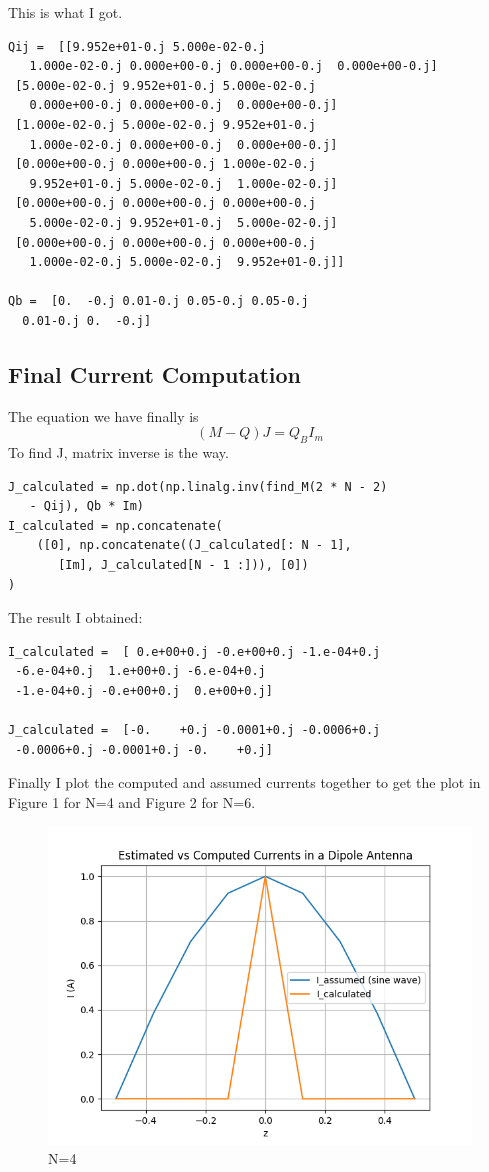 \documentclass[11pt, a4paper]{article}
\begin{document}
This is what I got.

\begin{verbatim}
Qij =  [[9.952e+01-0.j 5.000e-02-0.j 
   1.000e-02-0.j 0.000e+00-0.j 0.000e+00-0.j  0.000e+00-0.j]
 [5.000e-02-0.j 9.952e+01-0.j 5.000e-02-0.j 
   0.000e+00-0.j 0.000e+00-0.j  0.000e+00-0.j]
 [1.000e-02-0.j 5.000e-02-0.j 9.952e+01-0.j 
   1.000e-02-0.j 0.000e+00-0.j  0.000e+00-0.j]
 [0.000e+00-0.j 0.000e+00-0.j 1.000e-02-0.j 
   9.952e+01-0.j 5.000e-02-0.j  1.000e-02-0.j]
 [0.000e+00-0.j 0.000e+00-0.j 0.000e+00-0.j 
   5.000e-02-0.j 9.952e+01-0.j  5.000e-02-0.j]
 [0.000e+00-0.j 0.000e+00-0.j 0.000e+00-0.j 
   1.000e-02-0.j 5.000e-02-0.j  9.952e+01-0.j]]
  
Qb =  [0.  -0.j 0.01-0.j 0.05-0.j 0.05-0.j 
  0.01-0.j 0.  -0.j]
\end{verbatim}

\subsection{Final Current Computation}
The equation we have finally is
$$(M-Q)J=Q_BI_m$$
To find J, matrix inverse is the way.

\begin{verbatim}
J_calculated = np.dot(np.linalg.inv(find_M(2 * N - 2)
   - Qij), Qb * Im)
I_calculated = np.concatenate(
    ([0], np.concatenate((J_calculated[: N - 1],
       [Im], J_calculated[N - 1 :])), [0])
)
\end{verbatim}

The result I obtained:
\begin{verbatim}
I_calculated =  [ 0.e+00+0.j -0.e+00+0.j -1.e-04+0.j
 -6.e-04+0.j  1.e+00+0.j -6.e-04+0.j
 -1.e-04+0.j -0.e+00+0.j  0.e+00+0.j]
 
J_calculated =  [-0.    +0.j -0.0001+0.j -0.0006+0.j
 -0.0006+0.j -0.0001+0.j -0.    +0.j]
\end{verbatim}

Finally I plot the computed and assumed currents together to get the plot in Figure 1 for N=4 and Figure 2 for N=6.
\begin{figure}[!tbh]
   	\centering
  \includegraphics[scale=0.5]{f1.png} 
    \caption{N=4} 	
\end{figure}  
\end{document}
